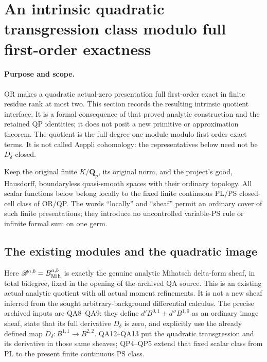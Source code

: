 \section{An intrinsic quadratic transgression class modulo full first-order exactness}
\label{sec:r11-intrinsic-quadratic-transgression}

\paragraph{Purpose and scope.}
OR makes a quadratic actual-zero presentation full first-order
exact in finite residue rank at most two.  This section records
the resulting intrinsic quotient interface.  It is a formal
consequence of that proved analytic construction and the retained
QP identities; it does not posit a new primitive or approximation
theorem.  The quotient is the full degree-one module modulo
first-order exact terms.  It is not called Aeppli cohomology:
the representatives below need not be \(D_\delta\)-closed.

Keep the original finite \(K/\mathbf Q_p\), its original norm,
and the project's good, Hausdorff, boundaryless quasi-smooth
spaces with their ordinary topology.  All scalar functions below
belong locally to the fixed finite continuous PL/PS closed-cell
class of OR/QP.  The words ``locally'' and ``sheaf'' permit an
ordinary cover of such finite presentations; they introduce no
uncontrolled variable-PS rule or infinite formal sum on one germ.

\subsection{The existing modules and the quadratic image}

Here \(\mathscr B^{a,b}=B^{a,b}_{\rm Mih}\) is exactly the
genuine analytic Mihatsch delta-form sheaf, in total bidegree,
fixed in the opening of the archived QA source.  This is an
existing actual analytic quotient with all actual moment
refinements.  It is not a new sheaf inferred from the sought
arbitrary-background differential calculus.  The precise archived
inputs are QA8--QA9: they define
\(d'B^{0,1}+d''B^{1,0}\) as an ordinary image sheaf,
state that its full derivative \(D_\delta\) is zero, and
explicitly use the already defined map
\(D_\delta:B^{1,1}\to B^{2,2}\).  QA12--QA13 put the
quadratic transgression and its derivative in those same sheaves;
QP4--QP5 extend that fixed scalar class from PL to the present
finite continuous PS class.

